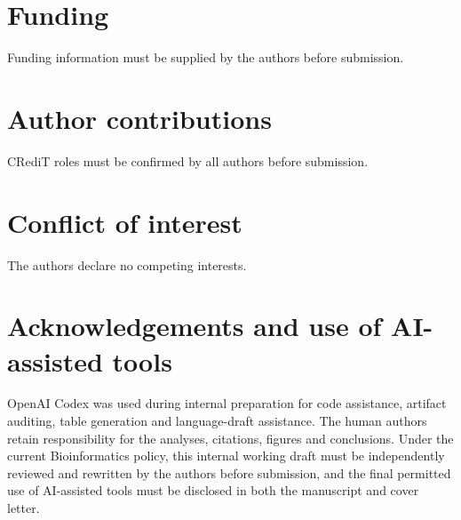 \documentclass[unnumsec,webpdf,contemporary,large,numbered]{oup-authoring-template}
\begin{document}
\section{Funding}

Funding information must be supplied by the authors before submission.

\section{Author contributions}

CRediT roles must be confirmed by all authors before submission.

\section{Conflict of interest}

The authors declare no competing interests.

\section{Acknowledgements and use of AI-assisted tools}

OpenAI Codex was used during internal preparation for code assistance, artifact auditing, table generation and language-draft assistance. The human authors retain responsibility for the analyses, citations, figures and conclusions. Under the current Bioinformatics policy, this internal working draft must be independently reviewed and rewritten by the authors before submission, and the final permitted use of AI-assisted tools must be disclosed in both the manuscript and cover letter.



\end{document}
